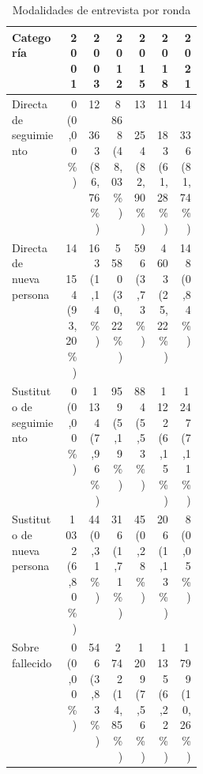 \begin{table}[!htbp]
\centering
\caption{Modalidades de entrevista por ronda}\label{tab:cp1-entrevistas}
\small\setlength{\tabcolsep}{4pt}
\renewcommand{\arraystretch}{1.15}
\begin{tabular}{p{0.28\linewidth}rrrrrr}
\toprule
\textbf{Categoría} & \textbf{2001} & \textbf{2003} & \textbf{2012} & \textbf{2015} & \textbf{2018} & \textbf{2021} \\
\midrule
Directa de seguimiento & \shortstack[r]{0\\(0,00\%)} & \shortstack[r]{12\,363\\(86,76\%)} & \shortstack[r]{8\,868\\(48,03\%)} & \shortstack[r]{13\,254\\(82,90\%)} & \shortstack[r]{11\,183\\(61,28\%)} & \shortstack[r]{14\,336\\(81,74\%)} \\
Directa de nueva persona & \shortstack[r]{14\,154\\(93,20\%)} & \shortstack[r]{163\\(1,14\%)} & \shortstack[r]{5\,580\\(30,22\%)} & \shortstack[r]{596\\(3,73\%)} & \shortstack[r]{4\,603\\(25,22\%)} & \shortstack[r]{148\\(0,84\%)} \\
Sustituto de seguimiento & \shortstack[r]{0\\(0,00\%)} & \shortstack[r]{1\,134\\(7,96\%)} & \shortstack[r]{959\\(5,19\%)} & \shortstack[r]{884\\(5,53\%)} & \shortstack[r]{1\,122\\(6,15\%)} & \shortstack[r]{1\,247\\(7,11\%)} \\
Sustituto de nueva persona & \shortstack[r]{1\,032\\(6,80\%)} & \shortstack[r]{44\\(0,31\%)} & \shortstack[r]{316\\(1,71\%)} & \shortstack[r]{45\\(0,28\%)} & \shortstack[r]{206\\(1,13\%)} & \shortstack[r]{8\\(0,05\%)} \\
Sobre fallecido & \shortstack[r]{0\\(0,00\%)} & \shortstack[r]{546\\(3,83\%)} & \shortstack[r]{2\,742\\(14,85\%)} & \shortstack[r]{1\,209\\(7,56\%)} & \shortstack[r]{1\,135\\(6,22\%)} & \shortstack[r]{1\,799\\(10,26\%)} \\

\end{tabular}
\end{table}
